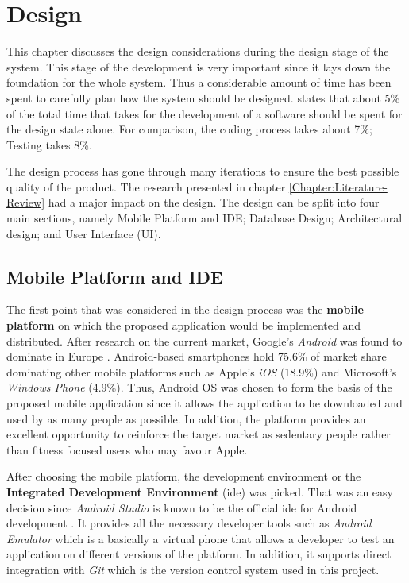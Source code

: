 \chapter{Design}
\label{Chapter:Design}

This chapter discusses the design considerations during the design stage of the system. This stage of the development is very important since it lays down the foundation for the whole system.
Thus a considerable amount of time has been spent to carefully plan how the system should be designed. \citet[12]{bell2005} states that about 5\% of the total time that takes for the development of a software should be spent for the design state alone. For comparison, the coding process takes about 7\%; Testing takes 8\%. 

The design process has gone through many iterations to ensure the best possible quality of the product. The research presented in chapter \ref{Chapter:Literature-Review} had a major impact on the design. The design can be split into four main sections, namely Mobile Platform and IDE; Database Design; Architectural design; and User Interface (UI).

    

    \section{Mobile Platform and IDE}
    The first point that was considered in the design process was the \textbf{mobile platform} on which the proposed application would be implemented and distributed. After research on the current market, Google's \textit{Android} was found to dominate in Europe \citep{williams2016}. Android-based smartphones hold 75.6\% of market share dominating other mobile platforms such as Apple's \textit{iOS} (18.9\%) and Microsoft's \textit{Windows Phone} (4.9\%). Thus, Android OS was chosen to form the basis of the proposed mobile application since it allows the application to be downloaded and used by as many people as possible. In addition, the platform provides an excellent opportunity to reinforce the target market as sedentary people rather than fitness focused users who may favour Apple.
        
    After choosing the mobile platform, the development environment or the \textbf{Integrated Development Environment} (\gls{ide}) was picked. That was an easy decision since \textit{Android Studio} is known to be the official \gls{ide} for Android development \citep{androidstudio2017}. It provides all the necessary developer tools such as \textit{Android Emulator} which is a basically a virtual phone that allows a developer to test an application on different versions of the platform. In addition, it supports direct integration with \textit{Git} which is the version control system used in this project.
    
